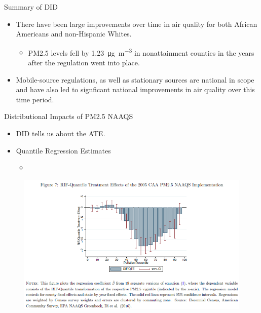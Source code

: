 \documentclass[dvipdfmx,12pt]{beamer}
\begin{document}
\begin{frame}{Summary of DID}
  \begin{itemize}
    \item There have been large improvements over time in air quality for both African Americans and non-Hispanic Whites.
    \begin{itemize}
      \item PM2.5 levels fell by \SI[per-mode=symbol]{1.23}{\micro \gram \per \cubic \meter} in nonattainment counties in
      the years after the regulation went into place.
    \end{itemize}
    \item Mobile-source regulations, as well as stationary sources are national in scope and have also led to signficant national improvements in air quality over this time period.
  \end{itemize}
\end{frame}

\begin{frame}{Distributional Impacts of PM2.5 NAAQS}
  \begin{itemize}
    \item DID tells us about the ATE.
    \item Quantile Regression Estimates
    \begin{itemize}
      \item 
    \end{itemize}
  \end{itemize}
\end{frame}

\begin{frame}{}
  \begin{figure}
    \centering
    \includegraphics[scale = .7]{F7.png}
  \end{figure}
\end{frame}
\end{document}
